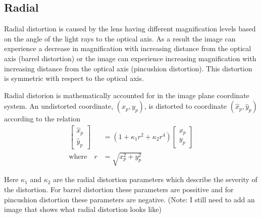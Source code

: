 \documentclass[12pt,oneside,openany,a4paper, %
english, %
masters-t, goldenblock]{usthesis}
\begin{document}
\subsection{Radial}
Radial distortion is caused by the lens having different magnification levels based on the angle of the light rays to the optical axis. As a result the image can experience a decrease in magnification with increasing distance from the optical axis (barrel distortion) or the image can experience increasing magnification with increasing distance from the optical axis (pincushion distortion). This distortion is symmetric with respect to the optical axis.

Radial distorion is mathematically accounted for in the image plane coordinate system. An undistorted coordinate, $(x_p,y_p)$, is distorted to coordinate $(\hat{x}_p, \hat{y}_p)$ according to the relation
\begin{align}
  \label{eq: radial distortion}
  \begin{bmatrix}
  \hat{x}_p \\
  \hat{y}_p
  \end{bmatrix} &=
  (1+\kappa_1 r^2+\kappa_2 r^4) 
  \begin{bmatrix}
  x_p \\
  y_p
  \end{bmatrix} \\
  \text{where} \quad r&=\sqrt{x_p^2+y_p^2}
\end{align}

Here $\kappa_1$ and $\kappa_2$ are the radial distortion parameters which describe the severity of the distortion. For barrel distortion these parameters are possitive and for pincushion distortion these parameters are negative.
(Note: I still need to add an image that shows what radial distortion looks like)

\end{document}
